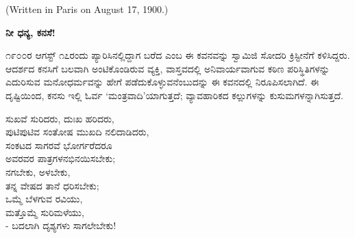 \begin{center}
(Written in Paris on August 17, 1900.)
\end{center}

\begin{myquote}
\end{myquote}

\begin{myquote}
\end{myquote}

\begin{myquote}
\end{myquote}

\selectkan

\begin{center}
\textbf{ನೀ ಧನ್ಯ, ಕನಸೆ!}
\end{center}

೧೯೦೦ರ ಆಗಸ್ಟ್ ೧೭ರಂದು ಪ್ಯಾರಿಸಿನಲ್ಲಿದ್ದಾಗ ಬರೆದ  ಎಂಬ ಈ ಕವನವನ್ನು ಸ್ವಾಮಿಜಿ ಸೋದರಿ ಕ್ರಿಸ್ಟೀನೆಗೆ ಕಳಿಸಿದ್ದರು. ಆದರ್ಶದ ಕನಸಿಗೆ ಬಲವಾಗಿ ಅಂಟಿಕೊಂಡಿರುವ ವ್ಯಕ್ತಿ, ವಾಸ್ತವದಲ್ಲಿ ಅನಿವಾರ್ಯವಾಗುವ ಕಠಿಣ ಪರಿಸ್ಥಿತಿಗಳನ್ನು ಎದುರಿಸುವ ಮನೋಧರ್ಮವನ್ನು ಹೇಗೆ ಪಡೆದುಕೊಳ್ಳುವನೆಂಬುದನ್ನು ಈ ಕವನದಲ್ಲಿ ನಿರೂಪಿಸಲಾಗಿದೆ. ಈ ದೃಷ್ಟಿಯಿಂದ, ಕನಸು ಇಲ್ಲಿ ಓರ್ವ ‘ಮಂತ್ರವಾದಿ’ಯಾಗುತ್ತದೆ; ವ್ಯಾವಹಾರಿಕದ ಕಲ್ಲುಗಳನ್ನು ಕುಸುಮಗಳನ್ನಾಗಿಸುತ್ತದೆ.

\begin{myquote}
ಸುಖವೆ ಸುರಿದರು, ದುಃಖ ಹರಿದರು,\\ಪುಟಿಪುಟಿವ ಸಂತೋಷ ಮುಖದಿ ನಲಿದಾಡಿದರು,\\ಸಂಕಟದ ಸಾಗರವೆ ಭೋರ್ಗರೆದರೂ\\ಅವರವರ ಪಾತ್ರಗಳನಭಿನಯಿಸಬೇಕು;\\ನಗಬೇಕು, ಅಳಬೇಕು,\\ತನ್ನ ವೇಷದ ತಾನೆ ಧರಿಸಬೇಕು;\\ಒಮ್ಮೆ ಬೆಳಗುವ ರವಿಯು,\\ಮತ್ತೊಮ್ಮೆ ಸುರಿಮಳೆಯು,\\- ಬದಲಾಗಿ ದೃಶ್ಯಗಳು ಸಾಗಲೇಬೇಕು!
\end{myquote}

